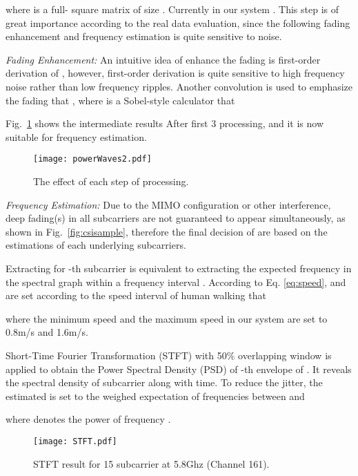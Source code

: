 where  is a full- square matrix of size
. Currently in our system . This step is of great importance
according to the real data evaluation, since the following fading
enhancement and frequency estimation is quite sensitive to noise.

\textit{Fading Enhancement:}
An intuitive idea of enhance the fading is first-order
derivation of , however, first-order
derivation is quite sensitive to high frequency noise
rather than low frequency ripples. 
Another convolution is used to emphasize the fading that , where  is a Sobel-style
calculator that

Fig.~\ref{fig:power} shows the intermediate results After first 3 processing, and it is now suitable for frequency estimation.


\begin{figure}[t]
\begin{center}
\texttt{[image: powerWaves2.pdf]}
\vspace{-0.15in}
\caption{The effect of each step of processing.}
\label{fig:power}
\vspace{-0.2in}
\end{center}
\end{figure}

\textit{Frequency Estimation:}
Due to the MIMO configuration or other interference, deep fading(s) in
all subcarriers are not guaranteed to appear simultaneously, as shown
in Fig.~\ref{fig:csisample}, therefore the final decision of  are
based on the estimations of each underlying subcarriers.

Extracting  for -th subcarrier is equivalent to extracting
the expected frequency  in the spectral graph within a
frequency interval . According to
Eq. \eqref{eq:speed},  and  are set according to the
speed interval of human walking that

where the minimum speed  and the maximum speed  in
our system are set to 0.8m/s and 1.6m/s.

Short-Time Fourier Transformation (STFT) with 50\% overlapping window
is applied to obtain the Power Spectral Density (PSD) of -th
envelope of . It reveals the spectral density of subcarrier
 along with time. To reduce the jitter, the estimated  is
set to the weighed expectation of frequencies between  and


where  denotes the power of frequency .

\begin{figure}[tb]
\begin{center}
\texttt{[image: STFT.pdf]}
\end{center}
\vspace{-0.25in}
\caption{STFT result for 15 subcarrier at 5.8Ghz (Channel 161).}
\label{fig:stft}
\vspace{-0.1in}
\end{figure}

